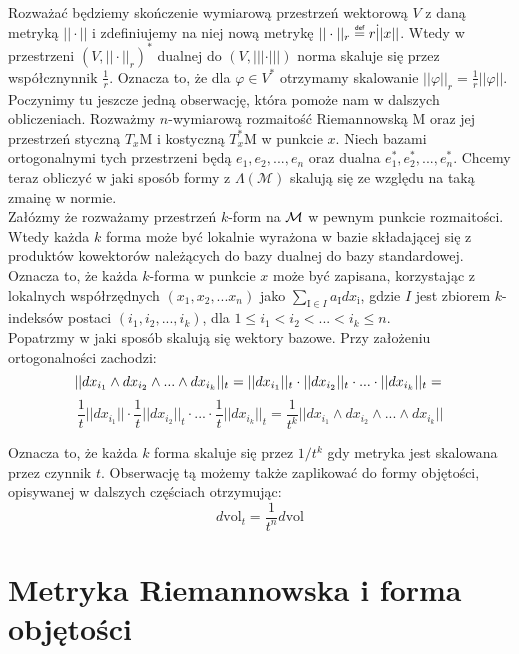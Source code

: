 \documentclass[licencjacka]{pracamgr}
\theoremstyle{definition}
\theoremstyle{definition}
\theoremstyle{plain}
\theoremstyle{plain}
\def\M{\ensuremath\mathcal{M}}
\newcommand\deff{\mathrel{\overset{\makebox[0pt]{\mbox{\normalfont\tiny\sffamily def}}}{=}}}
\begin{document}
Rozważać będziemy skończenie wymiarową przestrzeń wektorową $V$ z daną
metryką $|| \cdot ||$ i zdefiniujemy na niej nową metrykę $|| \cdot
||_r \deff r \dot || x ||$. Wtedy w przestrzeni $(V, ||
\cdot||_r)^\ast$ dualnej do $(V, ||| \cdot |||)$ norma skaluje się
przez współcznynnik $\frac{1}{r}$. Oznacza to, że dla $\varphi \in
V^\ast$ otrzymamy skalowanie $||\varphi||_r = \frac{1}{r} ||\varphi||$. \\

Poczynimy tu jeszcze jedną obserwację, która pomoże nam w dalszych
obliczeniach.  Rozważmy $n$-wymiarową rozmaitość Riemannowską
$\mathrm{M}$ oraz jej przestrzeń styczną $T_x\mathrm{M}$ i kostyczną
$T_x^\ast\mathrm{M}$ w punkcie $x$.  Niech bazami ortogonalnymi tych
przestrzeni będą $e_1, e_2, ..., e_n$ oraz dualna $e_1^\ast, e_2^\ast,
..., e_n^\ast$.  Chcemy teraz obliczyć w jaki sposób formy z
$\Lambda(\mathcal{M})$ skalują się ze względu na taką zmainę w
normie. \\

Załózmy że rozważamy przestrzeń $k$-form na $\M$ w pewnym
punkcie rozmaitości. Wtedy każda $k$ forma może być lokalnie wyrażona
w bazie składającej się z produktów kowektorów należących do bazy
dualnej do bazy standardowej. Oznacza to, że każda $k$-forma w punkcie
$x$ może być zapisana, korzystając z lokalnych współrzędnych $(x_1,
x_2, ... x_n)$ jako $ \sum_{\mathrm{I} \in I } a_\mathrm{I}
dx_\mathrm{i}$, gdzie $I$ jest zbiorem $k$-indeksów postaci
$(i_1, i_2, ..., i_k)$, dla $ 1 \leq i_1 < i_2 < ... < i_k \leq n$.  \\

Popatrzmy w jaki sposób skalują się wektory bazowe. Przy założeniu ortogonalności
zachodzi:
\[
    ||dx_{i_1} \wedge dx_{i_2} \wedge ... \wedge dx_{i_k} ||_t =  
    ||dx_{i_1} ||_t \cdot ||  dx_{i_2} ||_t \cdot ... \cdot || dx_{i_k} ||_t =  \\
\]
\[
    \frac{1}{t}||dx_{i_1} || \cdot \frac{1}{t} ||  dx_{i_2} ||_t \cdot ...
     \cdot \frac{1}{t} || dx_{i_k} ||_t = 
    \frac{1}{t^k}||dx_{i_1} \wedge dx_{i_2} \wedge ... \wedge dx_{i_k} ||
\]

Oznacza to, że każda $k$ forma skaluje się przez $1/t^k$ gdy metryka
jest skalowana przez czynnik $t$.  Obserwację tą możemy także
zaplikować do formy objętości, opisywanej w dalszych częściach  otrzymując:
\[
d\mathrm{vol}_t = \frac{1}{t^n} d\mathrm{vol}
\]

\section{Metryka Riemannowska i forma objętości}
\end{document}
